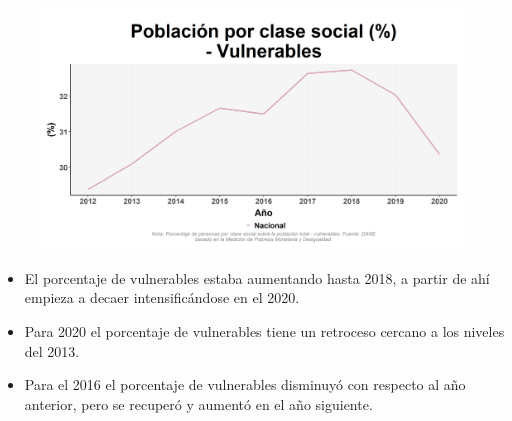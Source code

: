     \begin{figure}[H]
        \caption[Población por clase social - Vulnerables a nivel nacional ]{\label{vulnerables_nacional} }
        \begin{center}
        \includegraphics[width=\textwidth,keepaspectratio]{img/var_245_trend.png}
        \end{center}
    \end{figure}
            \begin{itemize}
                    \item El porcentaje de vulnerables estaba aumentando hasta 2018, a partir de ahí empieza a decaer intensificándose en el 2020.
                    \item Para 2020 el porcentaje de vulnerables tiene un retroceso cercano a los niveles del 2013.
                    \item Para el 2016 el porcentaje de vulnerables disminuyó con respecto al año anterior, pero se recuperó y aumentó en el año siguiente.
                    \end{itemize}


